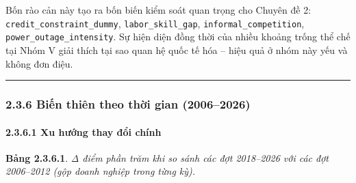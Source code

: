 \documentclass[
  a4paper,
  13pt]{extreport}
\begin{document}
Bốn rào cản này tạo ra bốn biến kiểm soát quan trọng cho Chuyên đề 2:
\texttt{credit\_constraint\_dummy}, \texttt{labor\_skill\_gap},
\texttt{informal\_competition}, \texttt{power\_outage\_intensity}. Sự
hiện diện đồng thời của nhiều khoảng trống thể chế tại Nhóm V giải thích
tại sao quan hệ quốc tế hóa -- hiệu quả ở nhóm này yếu và không đơn
điệu.

\begin{center}\rule{0.5\linewidth}{0.5pt}\end{center}

\hypertarget{biux1ebfn-thiuxean-theo-thux1eddi-gian-20062026}{%
\subsubsection{2.3.6 Biến thiên theo thời gian
(2006--2026)}\label{biux1ebfn-thiuxean-theo-thux1eddi-gian-20062026}}

\hypertarget{xu-hux1b0ux1edbng-thay-ux111ux1ed5i-chuxednh}{%
\paragraph{2.3.6.1 Xu hướng thay đổi
chính}\label{xu-hux1b0ux1edbng-thay-ux111ux1ed5i-chuxednh}}

\textbf{Bảng 2.3.6.1}. \emph{Δ điểm phần trăm khi so sánh các đợt
2018--2026 với các đợt 2006--2012 (gộp doanh nghiệp trong từng kỳ).}
\end{document}
